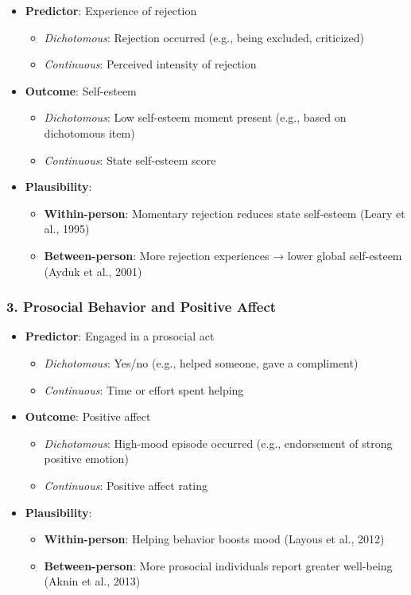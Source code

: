 \begin{itemize}
    \item \textbf{Predictor}: Experience of rejection
    \begin{itemize}
        \item \textit{Dichotomous}: Rejection occurred (e.g., being excluded, criticized)
        \item \textit{Continuous}: Perceived intensity of rejection
    \end{itemize}
    \item \textbf{Outcome}: Self-esteem
    \begin{itemize}
        \item \textit{Dichotomous}: Low self-esteem moment present (e.g., based on dichotomous item)
        \item \textit{Continuous}: State self-esteem score
    \end{itemize}
    \item \textbf{Plausibility}:
    \begin{itemize}
        \item \textbf{Within-person}: Momentary rejection reduces state self-esteem (Leary et al., 1995)
        \item \textbf{Between-person}: More rejection experiences → lower global self-esteem (Ayduk et al., 2001)
    \end{itemize}
\end{itemize}

\subsubsection{\textbf{3. Prosocial Behavior and Positive Affect}}

\begin{itemize}
    \item \textbf{Predictor}: Engaged in a prosocial act
    \begin{itemize}
        \item \textit{Dichotomous}: Yes/no (e.g., helped someone, gave a compliment)
        \item \textit{Continuous}: Time or effort spent helping
    \end{itemize}
    \item \textbf{Outcome}: Positive affect
    \begin{itemize}
        \item \textit{Dichotomous}: High-mood episode occurred (e.g., endorsement of strong positive emotion)
        \item \textit{Continuous}: Positive affect rating
    \end{itemize}
    \item \textbf{Plausibility}:
    \begin{itemize}
        \item \textbf{Within-person}: Helping behavior boosts mood (Layous et al., 2012)
        \item \textbf{Between-person}: More prosocial individuals report greater well-being (Aknin et al., 2013)
    \end{itemize}
\end{itemize}

